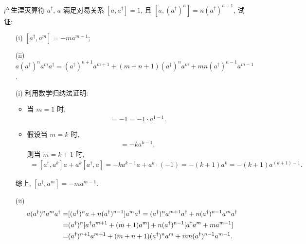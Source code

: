 \documentclass{assignment}
\begin{document}
\begin{prob}[20 分]
    产生湮灭算符 $a^{\dagger}$, $a$ 满足对易关系 $[a,a^{\dagger}]=1$, 且 $[a,(a^{\dagger})^n]=n(a^{\dagger})^{n-1}$, 试证:
    \begin{itemize}
        \item[(i)] $[a^{\dagger},a^m]=-ma^{m-1}$;
        \item[(ii)] $a(a^{\dagger})^na^ma^{\dagger}=(a^{\dagger})^{n+1}a^{m+1}+(m+n+1)(a^{\dagger})^na^m+mn(a^{\dagger})^{n-1}a^{m-1}$.
    \end{itemize}
\end{prob}
\begin{pf}
    \begin{itemize}
        \item[(i)] 利用数学归纳法证明:
        \begin{itemize}
            \item 当 $m=1$ 时,
            \begin{align}
                [a^{\dagger},a^1]=-1=-1\cdot a^{1-1}.
            \end{align}
            \item 假设当 $m=k$ 时,
            \begin{align}
                [a^{\dagger},a^k]=-ka^{k-1},
            \end{align}
            则当 $m=k+1$ 时,
            \begin{align}
                [a^{\dagger},a^{k+1}]=[a^{\dagger},a^k]a+a^k[a^{\dagger},a]=-ka^{k-1}a+a^k\cdot(-1)=-(k+1)a^k=-(k+1)a^{(k+1)-1}.
            \end{align}
        \end{itemize}
        综上, $[a^{\dagger},a^m]=-ma^{m-1}$.
        \item[(ii)] 
        \begin{align}
            \notag a(a^{\dagger})^na^ma^{\dagger}=&[(a^{\dagger})^na+n(a^{\dagger})^{n-1}]a^ma^{\dagger}=(a^{\dagger})^na^{m+1}a^{\dagger}+n(a^{\dagger})^{n-1}a^ma^{\dagger}\\
            \notag=&(a^{\dagger})^n[a^{\dagger}a^{m+1}+(m+1)a^m]+n(a^{\dagger})^{n-1}[a^{\dagger}a^m+ma^{m-1}]\\
            =&(a^{\dagger})^{n+1}a^{m+1}+(m+n+1)(a^{\dagger})^na^m+mn(a^{\dagger})^{n-1}a^{m-1}.
        \end{align}
    \end{itemize}
\end{pf}
\end{document}

